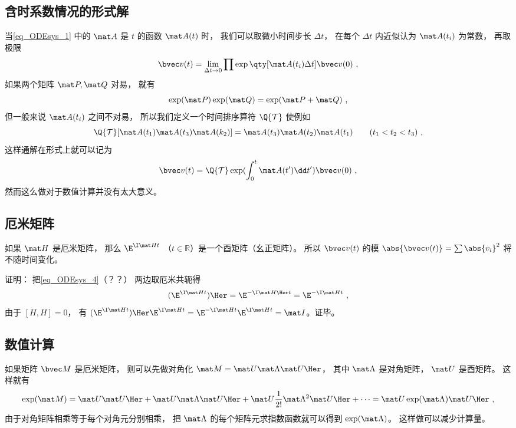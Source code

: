 \subsection{含时系数情况的形式解}
当\autoref{eq_ODEsys_1} 中的 $\mat A$ 是 $t$ 的函数 $\mat A(t)$ 时， 我们可以取微小时间步长 $\Delta t$， 在每个 $\Delta t$ 内近似认为 $\mat A(t_i)$ 为常数， 再取极限
\begin{equation}
\bvec v(t) = \lim_{\Delta t \to 0} \prod \exp\qty[\mat A(t_i)\Delta t] \bvec v(0)~,
\end{equation}
如果两个矩阵 $\mat P, \mat Q$ 对易， 就有
\begin{equation}
\exp(\mat P)\exp(\mat Q) = \exp(\mat P + \mat Q)~,
\end{equation}
但一般来说 $\mat A(t_i)$ 之间不对易， 所以我们定义一个时间排序算符 $\Q{\mathcal T}$ 使例如
\begin{equation}
\Q {\mathcal T} [\mat A(t_1) \mat A(t_3) \mat A(k_2)] = \mat A(t_3) \mat A(t_2) \mat A(t_1) \qquad ( t_1 < t_2 < t_3 )~,
\end{equation}
这样通解在形式上就可以记为
\begin{equation}\label{eq_ODEsys_3}
\bvec v(t) = \Q {\mathcal T} \exp(\int_0^ t \mat A(t')\dd t') \bvec v(0)~,
\end{equation}
然而这么做对于数值计算并没有太大意义。

\subsection{厄米矩阵}
如果 $\mat H$ 是厄米矩阵， 那么 $\E^{\I \mat H t}$ （$t\in \mathbb R$）是一个酉矩阵（幺正矩阵）。 所以 $\bvec v(t)$ 的模 $\abs{\bvec v(t)} = \sum \abs{v_i}^2$ 将不随时间变化。

证明： 把\autoref{eq_ODEsys_4}（？？） 两边取厄米共轭得
\begin{equation}
(\E^{\I \mat H t})\Her = \E^{-\I \mat H\Her t} = \E^{-\I \mat H t}~,
\end{equation}
由于 $[H,H] = 0$， 有 $(\E^{\I \mat H t})\Her \E^{\I \mat H t} = \E^{-\I \mat H t}\E^{\I \mat H t} = \mat I$。证毕。

\subsection{数值计算}
如果矩阵 $\bvec M$ 是厄米矩阵， 则可以先做对角化 $\mat M = \mat U \mat \Lambda \mat U\Her$， 其中 $\mat \Lambda$ 是对角矩阵， $\mat U$ 是酉矩阵。 这样就有
\begin{equation}
\exp(\mat M) = \mat U \mat U\Her + \mat U\mat \Lambda\mat U\Her + \mat U\frac1{2!} \mat \Lambda^2 \mat U\Her + \dots = \mat U \exp(\mat \Lambda) \mat U\Her~,
\end{equation}
由于对角矩阵相乘等于每个对角元分别相乘， 把 $\mat\Lambda$ 的每个矩阵元求指数函数就可以得到 $\exp(\mat \Lambda)$。 这样做可以减少计算量。

